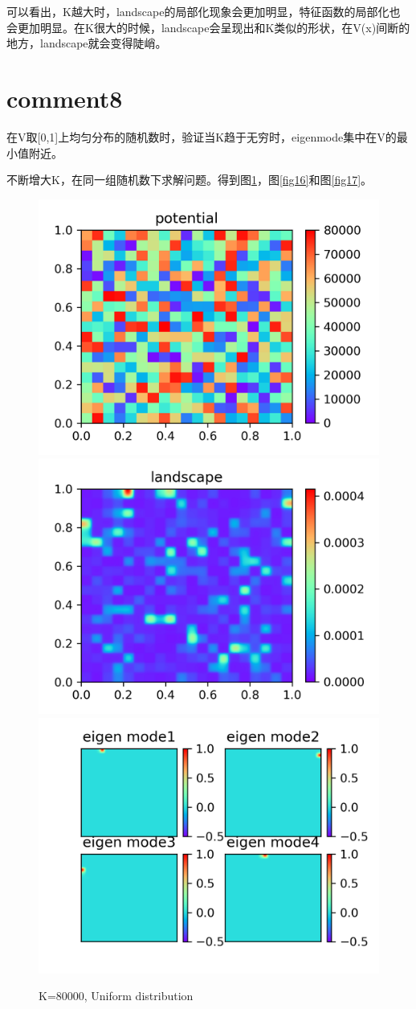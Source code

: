 \documentclass[UTF8,12pt]{article}
\begin{document}
可以看出，K越大时，landscape的局部化现象会更加明显，特征函数的局部化也会更加明显。在K很大的时候，landscape会呈现出和K类似的形状，在V(x)间断的地方，landscape就会变得陡峭。

\section{comment8}

在V取[0,1]上均匀分布的随机数时，验证当K趋于无穷时，eigenmode集中在V的最小值附近。

不断增大K，在同一组随机数下求解问题。得到图\ref{fig15}，图\ref{fig16}和图\ref{fig17}。

\begin{figure}[htbp]
    \centering
    \includegraphics[width=0.3\linewidth]{pic/v10}
    \includegraphics[width=0.3\linewidth]{pic/w10}
    \includegraphics[width=0.3\linewidth]{pic/u10}
    \caption{K=80000, Uniform distribution}
    \label{fig15}
\end{figure}
\end{document}
